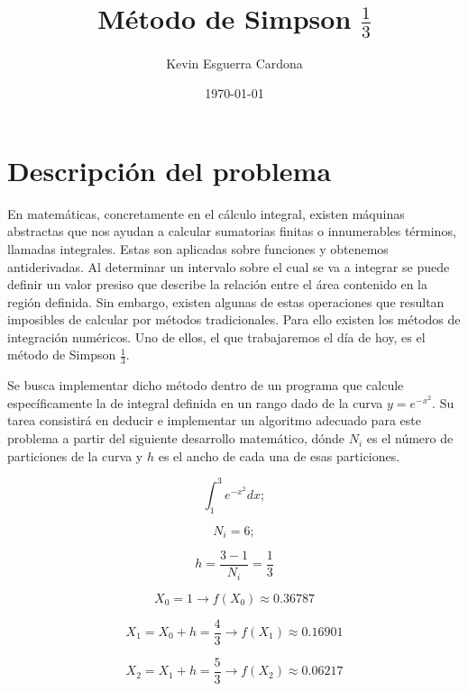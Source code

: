 \documentclass{article}
\title{Método de Simpson $\frac{1}{3}$}
\author{Kevin Esguerra Cardona}
\date{\today}
\begin{document}
\maketitle

\section*{Descripción del problema}
En matemáticas, concretamente en el cálculo integral, existen máquinas abstractas que nos ayudan a calcular sumatorias finitas o innumerables términos, llamadas integrales. Estas son aplicadas sobre funciones y obtenemos antiderivadas. Al determinar un intervalo sobre el cual se va a integrar se puede definir un valor presiso que describe la relación entre el área contenido en la región definida. Sin embargo, existen algunas de estas operaciones que resultan imposibles de calcular por métodos tradicionales. Para ello existen los métodos de integración numéricos. Uno de ellos, el que trabajaremos el día de hoy, es el método de Simpson $\frac{1}{3}$. 

Se busca implementar dicho método dentro de un programa que calcule específicamente la de integral definida en un rango dado de la curva $y = e^{-x^{2}}$. Su tarea consistirá en deducir e implementar un algoritmo adecuado para este problema a partir del siguiente desarrollo matemático, dónde $N_{i}$ es el número de particiones de la curva y $h$ es el ancho de cada una de esas particiones. 

\begin{equation}
    \int_{1}^{3} e^{-x^{2}} dx; 
\end{equation}

\begin{equation}
    N_{i} = 6;
\end{equation}

\begin{equation}
    h = \frac{3 - 1}{N_{i}} = \frac{1}{3}
\end{equation}

\begin{equation}
    X_{0} = 1 \rightarrow f(X_{0}) \approx 0.36787
\end{equation}

\begin{equation}
    X_{1} = X_{0} + h = \frac{4}{3} \rightarrow f(X_{1}) \approx 0.16901
\end{equation}

\begin{equation}
    X_{2} = X_{1} + h = \frac{5}{3} \rightarrow f(X_{2}) \approx 0.06217
\end{equation}
\end{document}
